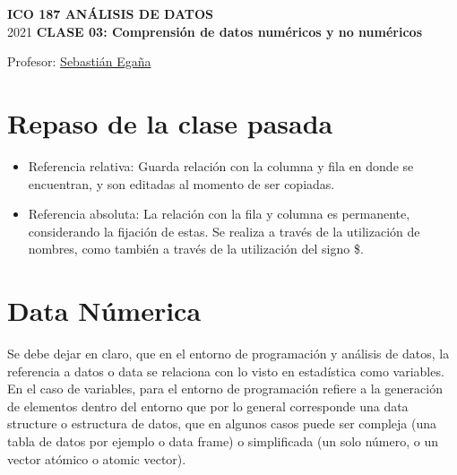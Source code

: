 \documentclass[12 pt,letterpaper]{article}
\begin{document}
%

	
	\pagestyle{fancy}
	\fancyhf{}
	\renewcommand{\headrulewidth}{0pt}
	\renewcommand{\footrulewidth}{0pt}	
	
\begin{center}
		
	\bigbreak
	\textbf{ICO 187 ANÁLISIS DE DATOS}\\
	\small{2021}
	\break
	\textbf{CLASE 03: Comprensión de datos numéricos y no numéricos}\\
\end{center}

\begin{flushright}	
		
	Profesor: \href{mailto:sebastianeganasa@santotomas.cl}{Sebastián Egaña}

\end{flushright}

\section{Repaso de la clase pasada}

\begin{itemize}
	\item Referencia relativa: Guarda relación con la columna y fila en donde se encuentran, y son editadas al momento de ser copiadas.
	
	\item Referencia absoluta: La relación con la fila y columna es permanente, considerando la fijación de estas. Se realiza a través de la utilización de nombres, como también a través de la utilización del signo \$.
\end{itemize}
	

\section{Data Númerica}

Se debe dejar en claro, que en el entorno de programación y análisis de datos, la referencia a datos o data se relaciona con lo visto en estadística como variables. En el caso de variables, para el entorno de programación refiere a la generación de elementos dentro del entorno que por lo general corresponde una data structure o estructura de datos, que en algunos casos puede ser compleja (una tabla de datos por ejemplo o data frame) o simplificada (un solo número, o un vector atómico o atomic vector).
\end{document}
